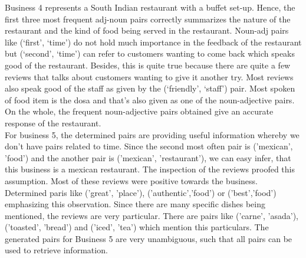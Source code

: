 Business 4 represents a South Indian restaurant with a buffet set-up. Hence, the first three most frequent adj-noun pairs correctly summarizes the nature of the restaurant and the kind of food being served in the restaurant. Noun-adj pairs like (‘first’, ‘time’) do not hold much importance in the feedback of the restaurant but (‘second’, ‘time’) can refer to customers wanting to come back which speaks good of the restaurant. Besides, this is quite true because there are quite a few reviews that talks about customers wanting to give it another try. Most reviews also speak good of the staff as given by the (‘friendly’, ‘staff’) pair. Most spoken of food item is the dosa and that’s also given as one of the noun-adjective pairs. On the whole, the frequent noun-adjective pairs obtained give an accurate response of the restaurant.\\
For business 5, the determined pairs are providing useful information whereby we don't have pairs related to time. Since the second most  often pair is ('mexican', 'food') and the another pair is ('mexican', 'restaurant'), we can easy infer, that this business is a mexican restaurant. The inspection of the reviews proofed this assumption. Most of these reviews were positive towards the business. Determined paris like ('great', 'place'), ('authentic','food') or ('best','food') emphasizing this observation. Since there are many specific dishes being mentioned, the reviews are very particular. There are pairs like ('carne', 'asada'), ('toasted', 'bread') and ('iced', 'tea') which mention this particulars. The generated pairs for Business 5 are very unambiguous, such that all pairs can be used to retrieve information.
	
